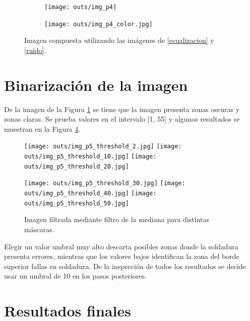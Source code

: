 \documentclass[
  letterpaper,
  twocolumn,
  9pt,
  journal,
  final]{IEEEtran}
\begin{document}
\begin{figure}[!tbh]
\centering

\begin{subfigure}[b]{\columnwidth}
 	\texttt{[image: outs/img\_p4]}
  \label{fig:pregunta4}
\end{subfigure}

\begin{subfigure}[b]{\columnwidth}
 	\texttt{[image: outs/img\_p4\_color.jpg]}
  \label{fig:pregunta4color}
\end{subfigure}

\caption{Imagen compuesta utilizando las imágenes de \ref{ecualizacion} y \ref{ruido}.} \label{fig:p4_both}
\end{figure}


\section{Binarización de la imagen}\label{bin}


De la imagen de la Figura \ref{fig:pregunta4} se tiene que la imagen presenta zonas oscuras y zonas claras. Se prueba valores en el intervalo [1, 55] y algunos resultados se muestran en la Figura \ref{fig:threshold_grid}.


\begin{figure}[!tbh]
\centering
\texttt{[image: outs/img\_p5\_threshold\_2.jpg]}\quad
\texttt{[image: outs/img\_p5\_threshold\_10.jpg]}\quad
\texttt{[image: outs/img\_p5\_threshold\_20.jpg]}

\medskip

\texttt{[image: outs/img\_p5\_threshold\_30.jpg]}\quad
\texttt{[image: outs/img\_p5\_threshold\_40.jpg]}\quad
\texttt{[image: outs/img\_p5\_threshold\_50.jpg]}

 \caption{Imagen filtrada mediante filtro de la mediana para distintas máscaras.}
 \label{fig:threshold_grid}
\end{figure}

Elegir un valor umbral muy alto descarta posibles zonas donde la soldadura presenta errores, mientras que los valores bajos identifican la zona del borde superior fallas en soldadura. De la inspección de todos los resultados se decide usar un umbral de 10 en los pasos posteriores.


\section{Resultados finales}
\end{document}

